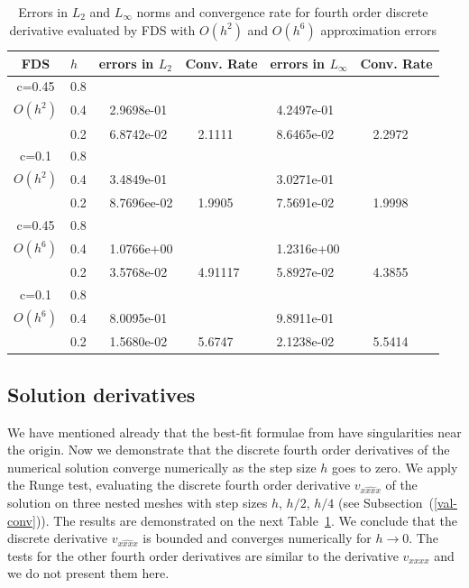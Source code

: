 \documentclass[preprint]{elsarticle}
\newcommand{\rf}[1]{(\ref{#1})}
\begin{document}
 \begin{center}
\begin{table}[ht]
\centering
		\begin{tabular}{||c|l|ll|ll||}
			\hline
			\hline
      FDS       & $h$ &errors in $L_2$&Conv. Rate& errors in $L_\infty$&Conv. Rate\\
   			\hline 
					\hline 
      c=0.45    &0.8    &             &            &           &   \\
   $O(h^2)$     &0.4    &~ 2.9698e-01  &            &~4.2497e-01 &   \\
                &0.2   &~ 6.8742e-02  &~~2.1111  &~8.6465e-02 &~~2.2972 \\
               	 \hline 
     c=0.1      &0.8   &             &           &                & \\
     $O(h^2)$   &0.4   &~ 3.4849e-01  &             &~3.0271e-01      &    \\
                &0.2  &~ 8.7696ee-02 &~~1.9905       &~7.5691e-02      &~~1.9998  \\
			\hline
			\hline 	
      c=0.45    &0.8   &            &            &             &    \\
       $O(h^6)$ &0.4   &~ 1.0766e+00   &           &~1.2316e+00  &   \\
                &0.2  &~ 3.5768e-02 &~~4.91117    &~5.8927e-02  &~~4.3855  \\
					  			\hline 	
     c=0.1      &0.8  &            &               &               &     \\
     $O(h^6)$  &0.4   &~ 8.0095e-01  &              &~9.8911e-01      &        \\
               &0.2  &~ 1.5680e-02&~~5.6747        &~2.1238e-02 &~~5.5414       \\
		   \hline
			\hline 
		\end{tabular}
		\caption{Errors  in $L_2$ and $L_\infty$ norms and  convergence  rate for  fourth order discrete derivative  evaluated by FDS with $O(h^2)$ and $O(h^6)$ approximation errors}
\label{tab:fourth-der}
\end{table}
\end{center}

\subsection{Solution derivatives}

We have mentioned already that the best-fit formulae from \cite{Ch2011} have singularities near the origin. 
Now we demonstrate  that the discrete fourth order derivatives of the numerical solution converge numerically as the step size $h$ goes to zero.
We apply the Runge test, evaluating the discrete fourth order derivative $v_{\widehat{xxxx}}$ of the solution on three nested meshes with step sizes $h$, $h/2$, $h/4$ (see Subsection~\rf{val-conv}).  The results are demonstrated on the next Table~\ref{tab:fourth-der}.  
We conclude that the discrete  derivative $v_{\widehat{xxxx}}$ is bounded and converges numerically for $h\rightarrow 0$. The tests for the other fourth order derivatives are similar to the derivative $v_{xxxx}$ and we do not present them here.
\end{document}
